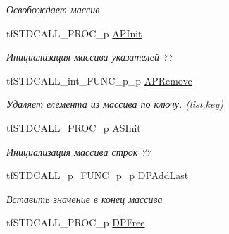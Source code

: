 \begin{DoxyCompactItemize}
\begin{DoxyCompactList}\small\item\em Освобождает массив \end{DoxyCompactList}\item 
\hypertarget{structs_functions_array_c_p_u_a55f57daa6bec159168cb06a24528aa66}{tf\-S\-T\-D\-C\-A\-L\-L\-\_\-\-P\-R\-O\-C\-\_\-p \hyperlink{structs_functions_array_c_p_u_a55f57daa6bec159168cb06a24528aa66}{A\-P\-Init}}\label{structs_functions_array_c_p_u_a55f57daa6bec159168cb06a24528aa66}

\begin{DoxyCompactList}\small\item\em Инициализация массива указателей ?? \end{DoxyCompactList}\item 
\hypertarget{structs_functions_array_c_p_u_a320845d068f99a4899985d84f8ff90b8}{tf\-S\-T\-D\-C\-A\-L\-L\-\_\-int\-\_\-\-F\-U\-N\-C\-\_\-p\-\_\-p \hyperlink{structs_functions_array_c_p_u_a320845d068f99a4899985d84f8ff90b8}{A\-P\-Remove}}\label{structs_functions_array_c_p_u_a320845d068f99a4899985d84f8ff90b8}

\begin{DoxyCompactList}\small\item\em Удаляет елемента из массива по ключу. (list,key) \end{DoxyCompactList}\item 
\hypertarget{structs_functions_array_c_p_u_ae227a4015d636f18a669e78d26b6602d}{tf\-S\-T\-D\-C\-A\-L\-L\-\_\-\-P\-R\-O\-C\-\_\-p \hyperlink{structs_functions_array_c_p_u_ae227a4015d636f18a669e78d26b6602d}{A\-S\-Init}}\label{structs_functions_array_c_p_u_ae227a4015d636f18a669e78d26b6602d}

\begin{DoxyCompactList}\small\item\em Инициализация массива строк ?? \end{DoxyCompactList}\item 
\hypertarget{structs_functions_array_c_p_u_ae7e333724091d4def717118939fe8851}{tf\-S\-T\-D\-C\-A\-L\-L\-\_\-p\-\_\-\-F\-U\-N\-C\-\_\-p\-\_\-p \hyperlink{structs_functions_array_c_p_u_ae7e333724091d4def717118939fe8851}{D\-P\-Add\-Last}}\label{structs_functions_array_c_p_u_ae7e333724091d4def717118939fe8851}

\begin{DoxyCompactList}\small\item\em Вставить значение в конец массива \end{DoxyCompactList}\item 
\hypertarget{structs_functions_array_c_p_u_aa77dee75602ca444834d7be0c00c0102}{tf\-S\-T\-D\-C\-A\-L\-L\-\_\-\-P\-R\-O\-C\-\_\-p \hyperlink{structs_functions_array_c_p_u_aa77dee75602ca444834d7be0c00c0102}{D\-P\-Free}}\label{structs_functions_array_c_p_u_aa77dee75602ca444834d7be0c00c0102}


\end{DoxyCompactItemize}
